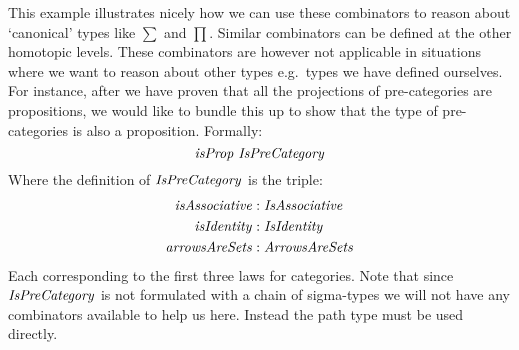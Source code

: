 This example illustrates nicely how we can use these combinators to
reason about `canonical' types like $∑$ and $∏$.  Similar
combinators can be defined at the other homotopic levels.  These
combinators are however not applicable in situations where we want to
reason about other types e.g.\ types we have defined ourselves.  For
instance, after we have proven that all the projections of
pre-categories are propositions, we would like to bundle this up to
show that the type of pre-categories is also a proposition.  Formally:
%
\begin{equation}
  \label{eq:propIsPreCategory}
  \isProp\ \IsPreCategory
\end{equation}
%
Where the definition of $\IsPreCategory$ is the triple:
%
\begin{align*}
  \var{isAssociative} & \tp \var{IsAssociative}\\
  \isIdentity    & \tp \var{IsIdentity}\\
  \var{arrowsAreSets} & \tp \var{ArrowsAreSets}
\end{align*}
%
Each corresponding to the first three laws for categories.  Note that
since $\IsPreCategory$ is not formulated with a chain of sigma-types
we will not have any combinators available to help us here.  Instead
the path type must be used directly.

